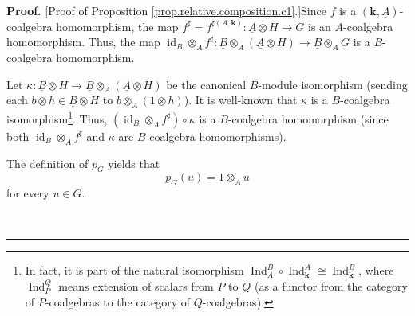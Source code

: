 \documentclass
[numbers=enddot,12pt,final,onecolumn,notitlepage,abstracton]{scrartcl}%
\theoremstyle{definition}
\newenvironment{proof}[1][Proof]{\noindent\textbf{#1.} }{\ \rule{0.5em}{0.5em}}
\begin{document}
\begin{proof}
[Proof of Proposition \ref{prop.relative.composition.c1}.]Since $f$ is a
$\left(  \mathbf{k},\underline{A}\right)  $-coalgebra homomorphism, the map
$f^{\sharp}=f^{\sharp\left(  A,\mathbf{k}\right)  }:\underline{A}\otimes
H\rightarrow G$ is an $A$-coalgebra homomorphism. Thus, the map
$\operatorname*{id}\nolimits_{B}\otimes_{A}f^{\sharp}:\underline{B}\otimes
_{A}\left(  \underline{A}\otimes H\right)  \rightarrow\underline{B}\otimes
_{A}G$ is a $B$-coalgebra homomorphism.

Let $\kappa:\underline{B}\otimes H\rightarrow\underline{B}\otimes_{A}\left(
\underline{A}\otimes H\right)  $ be the canonical $B$-module isomorphism
(sending each $b\otimes h\in\underline{B}\otimes H$ to $b\otimes_{A}\left(
1\otimes h\right)  $). It is well-known that $\kappa$ is a $B$-coalgebra
isomorphism\footnote{In fact, it is part of the natural isomorphism
$\operatorname*{Ind}\nolimits_{A}^{B}\circ\operatorname*{Ind}%
\nolimits_{\mathbf{k}}^{A}\cong\operatorname*{Ind}\nolimits_{\mathbf{k}}^{B}$,
where $\operatorname*{Ind}\nolimits_{P}^{Q}$ means extension of scalars from
$P$ to $Q$ (as a functor from the category of $P$-coalgebras to the category
of $Q$-coalgebras).}. Thus, $\left(  \operatorname*{id}\nolimits_{B}%
\otimes_{A}f^{\sharp}\right)  \circ\kappa$ is a $B$-coalgebra homomorphism
(since both $\operatorname*{id}\nolimits_{B}\otimes_{A}f^{\sharp}$ and
$\kappa$ are $B$-coalgebra homomorphisms).

The definition of $p_{G}$ yields that
\begin{equation}
p_{G}\left(  u\right)  =1\otimes_{A}u
\label{pf.prop.relative.composition.c1.1}%
\end{equation}
for every $u\in G$.


\end{proof}
\end{document}
